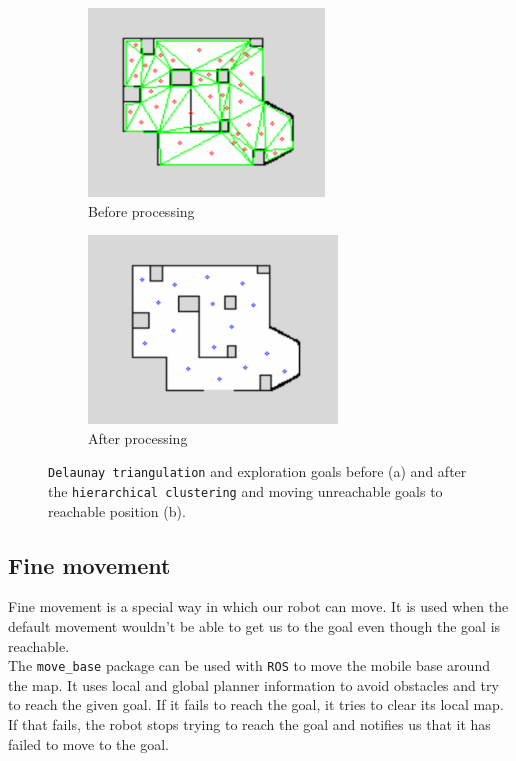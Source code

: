 \documentclass[12pt,a4paper]{article}
\begin{document}
	\begin{figure}[h]
		\begin{subfigure}{.5\textwidth}
			\centering
			\includegraphics[height=5cm]{images/before}
			\caption{Before processing}
			\label{fig:before_clustering}
		\end{subfigure}
		\begin{subfigure}{.5\textwidth}
			\centering
			\includegraphics[height=5cm]{images/after}
			\caption{After processing}
			\label{fig:after_clustering}
		\end{subfigure}
		\caption{\texttt{Delaunay triangulation} and exploration goals before (a) and after the \texttt{hierarchical clustering} and moving unreachable goals to reachable position (b).}
		\label{fig:exploration_goals}
	\end{figure}
	
	\subsection{Fine movement} \label{fine_movement}
	Fine movement is a special way in which our robot can move. It is used when the default movement wouldn't be able to get us to the goal even though the goal is reachable.  \\

	The \texttt{move\_base} package can be used with \texttt{ROS} to move the mobile base around the map. It uses local and global planner information to avoid obstacles and try to reach the given goal. If it fails to reach the goal, it tries to clear its local map. If that fails, the robot stops trying to reach the goal and notifies us that it has failed to move to the goal. \\
	
\end{document}
